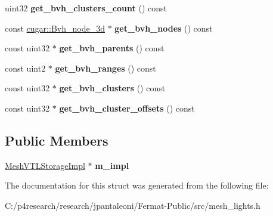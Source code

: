\begin{DoxyCompactItemize}
uint32 {\bfseries get\+\_\+bvh\+\_\+clusters\+\_\+count} () const
\item 
\mbox{\label{struct_mesh_v_t_l_storage_adbb98bbbe8f0df8e653745adaa2b3460}} 
const \hyperlink{structcugar_1_1_bvh__node__3d}{cugar\+::\+Bvh\+\_\+node\+\_\+3d} $\ast$ {\bfseries get\+\_\+bvh\+\_\+nodes} () const
\item 
\mbox{\label{struct_mesh_v_t_l_storage_a21b36943fa914e046dbb1249a8a4feed}} 
const uint32 $\ast$ {\bfseries get\+\_\+bvh\+\_\+parents} () const
\item 
\mbox{\label{struct_mesh_v_t_l_storage_a5fc239965f060b77103bbca81b50cfe4}} 
const uint2 $\ast$ {\bfseries get\+\_\+bvh\+\_\+ranges} () const
\item 
\mbox{\label{struct_mesh_v_t_l_storage_a7eddfb7c9186eb77ad7a5eaeeb60faa7}} 
const uint32 $\ast$ {\bfseries get\+\_\+bvh\+\_\+clusters} () const
\item 
\mbox{\label{struct_mesh_v_t_l_storage_a7e8a87e002cdfab4af359512e32d9401}} 
const uint32 $\ast$ {\bfseries get\+\_\+bvh\+\_\+cluster\+\_\+offsets} () const
\end{DoxyCompactItemize}
\subsection*{Public Members}
\begin{DoxyCompactItemize}
\item 
\mbox{\label{struct_mesh_v_t_l_storage_ab83912bd57d30ec61c2a88bb5a0a0eef}} 
\hyperlink{struct_mesh_v_t_l_storage_impl}{Mesh\+V\+T\+L\+Storage\+Impl} $\ast$ {\bfseries m\+\_\+impl}
\end{DoxyCompactItemize}


The documentation for this struct was generated from the following file\+:\begin{DoxyCompactItemize}
\item 
C\+:/p4research/research/jpantaleoni/\+Fermat-\/\+Public/src/mesh\+\_\+lights.\+h\end{DoxyCompactItemize}

